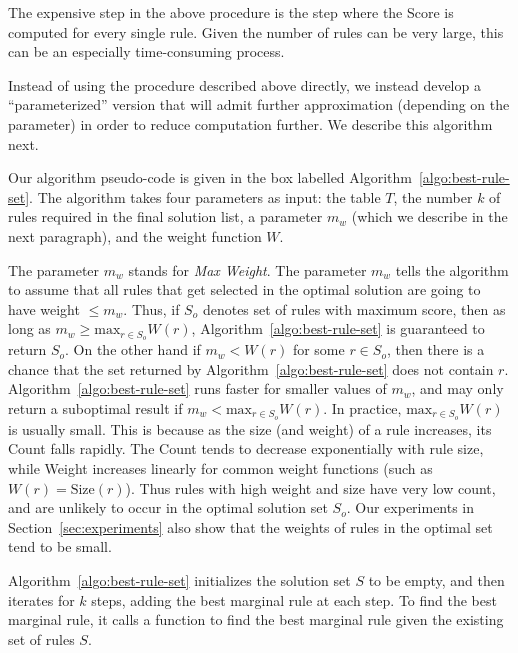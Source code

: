 The expensive step in the above procedure is the step where the Score is computed for every
single rule. Given the number of rules can be very large, this can be an especially time-consuming process.

Instead of using the procedure described above directly, we instead develop a ``parameterized'' version 
that will admit further approximation (depending on the parameter) in order to reduce computation further. We describe
this algorithm next.

 Our algorithm pseudo-code is given in the box labelled Algorithm~\ref{algo:best-rule-set}. The algorithm takes four parameters as input: the table $T$, the number $k$ of rules required in the final solution list, a parameter $m_w$ (which we describe in the next paragraph), and the weight function $W$. 

The parameter $m_w$ stands for \textit{Max Weight}. The parameter $m_w$ tells the algorithm to assume that all rules that get selected in the optimal solution are going to have weight $\leq m_w$. Thus, if $S_o$ denotes set of rules with maximum score, then as long as $m_w \geq \textrm{max}_{r \in S_o}W(r)$, Algorithm~\ref{algo:best-rule-set} is guaranteed to return $S_o$. On the other hand if $m_w < W(r)$ for some $r \in S_o$, then there is a chance that the set returned by Algorithm~\ref{algo:best-rule-set} does not contain $r$. Algorithm~\ref{algo:best-rule-set} runs faster for smaller values of $m_w$, and may only return a suboptimal result if $m_w < \textrm{max}_{r \in S_o}W(r)$. In practice, $\textrm{max}_{r \in S_o}W(r)$ is usually small. This is because as the size (and weight) of a rule increases, its Count falls rapidly. The Count tends to decrease exponentially with rule size, while Weight increases linearly for common weight functions (such as $W(r) = \text{Size}(r)$). Thus rules with high weight and size have very low count, and are unlikely to occur in the optimal solution set $S_o$. Our experiments in Section~\ref{sec:experiments} also show that the weights of rules in the optimal set tend to be small.


Algorithm~\ref{algo:best-rule-set} initializes the solution set $S$ to be empty, and then iterates for $k$ steps, adding the best marginal rule at each step. To find the best marginal rule, it calls a function to find the best marginal rule given the existing set of rules $S$. 


